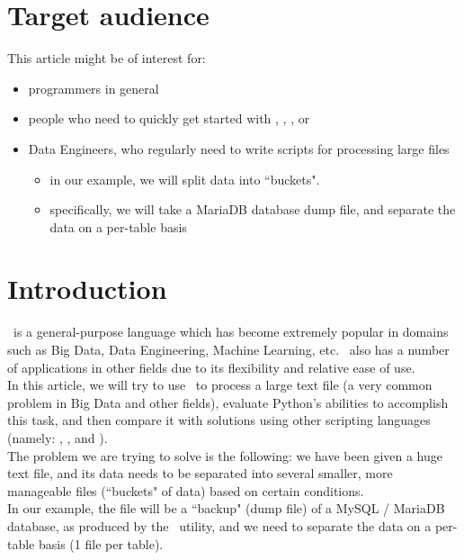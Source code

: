 
\renewcommand{\currentPart}{Preamble}

\section*{Target audience}

This article might be of interest for:
\begin{itemize}
	\item programmers in general
	\item people who need to quickly get started with \python, \awk, \perl, or \julia
	\item Data Engineers, who regularly need to write scripts for processing large files
	\begin{itemize}
		\item in our example, we will split data into ``buckets".
		\item specifically, we will take a MariaDB database dump file, and separate the data on a per-table basis
	\end{itemize}
\end{itemize}




\newpage

\section*{Introduction}

\python\ is a general-purpose language which has become extremely popular in domains such as Big Data, Data Engineering, Machine Learning, etc. \python\ also has a number of applications in other fields due to its flexibility and relative ease of use. \\

In this article, we will try to use \python\ to process a large text file (a very common problem in Big Data and other fields), evaluate Python's abilities to accomplish this task, and then compare it with solutions using other scripting languages (namely: \awk, \perl, and \julia). \\

The problem we are trying to solve is the following: we have been given a huge text file, and its data needs to be separated into several smaller, more manageable files (``buckets" of data) based on certain conditions. \\

In our example, the file will be a ``backup" (dump file) of a MySQL / MariaDB database, as produced by the \mysqldump\ utility, and we need to separate the data on a per-table basis (1 file per table). \\

